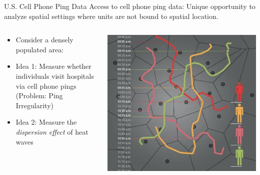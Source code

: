 \begin{frame}{U.S. Cell Phone Ping Data}
Access to cell phone ping data: Unique opportunity to analyze spatial settings where units are not bound to spatial location.
\vspace{5pt}
\begin{columns}
    \begin{column}{0.65\linewidth}
    \begin{itemize}
    \item Consider a densely populated area:
    \vspace{-7pt}
    \item Idea 1: Measure whether individuals visit hospitals via cell phone pings (Problem: Ping Irregularity)
    \vspace{-7pt}
    \item Idea 2: Measure the \textit{dispersion effect} of heat waves
    \end{itemize}
    \end{column}
     \begin{column}{0.4\linewidth}
      \includegraphics[scale=0.16]{figures/cell_ping.png}
      \caption{}
    \end{column}
\end{columns}
\end{frame}
